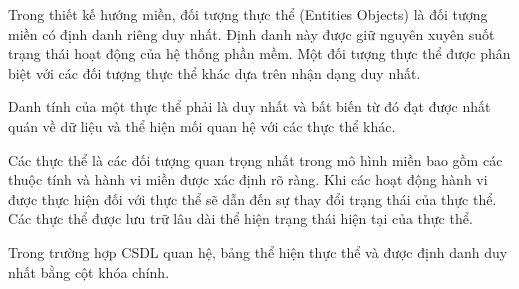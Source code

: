 Trong  thiết kế hướng miền, đối tượng thực thể (Entities Objects)  là        đối tượng miền   có định danh riêng duy nhất. Định danh này được giữ nguyên xuyên suốt trạng thái hoạt động của hệ thống phần mềm. Một đối tượng       thực thể     được phân biệt với các đối tượng thực thể  khác dựa trên nhận dạng duy nhất.

Danh tính của một thực thể phải là duy nhất và bất biến từ đó đạt được nhất quán về dữ liệu    và thể hiện mối quan hệ với các thực thể   khác.


Các thực thể   là các đối tượng quan trọng nhất trong mô hình miền     bao gồm các thuộc tính và hành vi miền được xác định rõ ràng.  Khi các hoạt động  hành vi được thực hiện đối với thực thể sẽ dẫn đến sự thay đổi trạng thái của thực thể.    Các thực thể được lưu trữ lâu dài thể hiện trạng thái hiện tại của thực thể. 


\begin{example}     Trong trường hợp CSDL quan hệ,   bảng            thể hiện  thực thể và được  định danh duy nhất bằng cột khóa chính.
    
\end{example}



